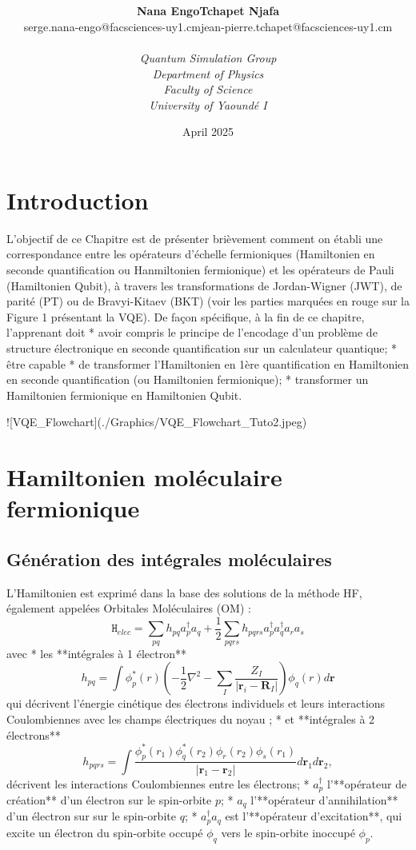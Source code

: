 \documentclass[12pt,a4paper]{article} %
\title{\vspace*{4cm}
\Huge\tcb{Chapter 2 - Hamiltonien Qubit}
\vspace*{5cm}}
\author{
\begin{tabular}{lr}
 \textbf{Nana Engo} & \textbf{Tchapet Njafa}\\
 {\small serge.nana-engo@facsciences-uy1.cm} &\hspace*{2em}
 {\small jean-pierre.tchapet@facsciences-uy1.cm}
\end{tabular}\\[3em] %
\textit{Quantum Simulation Group}\\
 \textit{Department of Physics} \\ 
 \textit{Faculty of Science} \\ 
 \textit{University of Yaoundé I}
}
\date{\vspace*{3cm}April 2025} %
\numberwithin{equation}{section} %
\numberwithin{figure}{section} %
\numberwithin{table}{section} %
\begin{document}
\maketitle %

\newpage
\section{Introduction}

L'objectif de ce Chapitre est de présenter brièvement comment on établi une correspondance entre les opérateurs d'échelle fermioniques (Hamiltonien en seconde quantification ou Hanmiltonien fermionique) et les opérateurs de Pauli (Hamiltonien Qubit), à travers les transformations de Jordan-Wigner (JWT), de parité (PT) ou de Bravyi-Kitaev (BKT) (voir les parties marquées en rouge sur la Figure 1 présentant la VQE). De façon spécifique, à la fin de ce chapitre, l'apprenant doit
* avoir compris le principe de l'encodage d'un problème de structure électronique en seconde quantification sur un calculateur quantique;
* être capable 
	* de transformer l'Hamiltonien en 1ère quantification en Hamiltonien en seconde quantification (ou Hamiltonien fermionique);
    * transformer un Hamiltonien fermionique en Hamiltonien Qubit.

![VQE_Flowchart](./Graphics/VQE_Flowchart_Tuto2.jpeg)

\section{Hamiltonien moléculaire fermionique}

\subsection{Génération des intégrales moléculaires}

L'Hamiltonien  est exprimé dans la base des solutions de la méthode HF, également appelées Orbitales Moléculaires (OM) :
$$
\mathtt{H}_{elec}=\sum_{pq} h_{pq} a^{\dagger}_p a_q + 
\frac{1}{2} \sum_{pqrs} h_{pqrs}  a^{\dagger}_p a^{\dagger}_q a_r  a_s
$$
avec 
* les **intégrales à 1 électron**
$$
h_{pq} = \int \phi^*_p(r) \left( -\frac{1}{2} \nabla^2 - \sum_{I} \frac{Z_I}{|\mathbf{r}_i-\mathbf{R}_I|} \right)   \phi_q(r)d\mathbf{r}
$$
qui décrivent l’énergie cinétique des électrons individuels et leurs interactions Coulombiennes avec les champs électriques du noyau ;
* et **intégrales à 2 électrons**
$$
h_{pqrs} = \int \frac{\phi^*_p(r_1)  \phi^*_q(r_2) \phi_r(r_2)  \phi_s(r_1)}{|\mathbf{r}_1-\mathbf{r}_2|}d\mathbf{r}_1d\mathbf{r}_2,
$$
décrivent les interactions Coulombiennes entre les électrons;
* $a^\dagger_p$ l'**opérateur de création** d'un électron sur le spin-orbite $p$;
* $a_q$ l'**opérateur d'annihilation** d'un électron sur sur le spin-orbite $q$;
* $a^{\dagger}_p a_q $ est l'**opérateur d'excitation**, qui excite un électron du spin-orbite occupé $\phi_q$ vers le spin-orbite inoccupé $\phi_p$.
\end{document}
